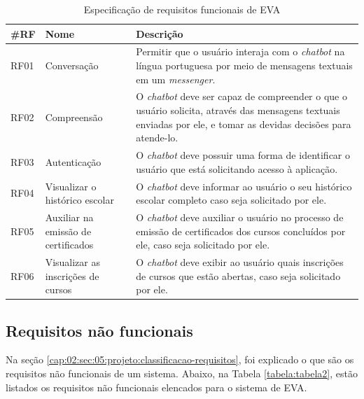 \begin{table}[htb]
\caption{Especificação de requisitos funcionais de EVA}
\label{tabela:tabela1}
\centering
\medskip
\begin{tabular}{|p{1.2cm}|p{3.5cm}|p{7.5cm}|}
  \hline
   \textbf{\#RF} & \textbf{Nome}  & \textbf{Descrição}  \\
    \hline
    RF01 & Conversação & Permitir que o usuário interaja com o \textit{chatbot} na língua portuguesa por meio de mensagens textuais em um \textit{messenger}. \\
    \hline
    RF02 & Compreensão & O \textit{chatbot} deve ser capaz de compreender o que o usuário solicita, através das mensagens textuais enviadas por ele, e tomar as devidas decisões para atende-lo. \\
    \hline
    RF03 & Autenticação & O \textit{chatbot} deve possuir uma forma de identificar o usuário que está solicitando acesso à aplicação. \\
   \hline
     RF04 & Visualizar o histórico escolar & O \textit{chatbot} deve informar ao usuário o seu histórico escolar completo caso seja solicitado por ele. \\
   \hline
    RF05 & Auxiliar na emissão de certificados & O \textit{chatbot} deve auxiliar o usuário no processo de emissão de certificados dos cursos concluídos por ele, caso seja solicitado por ele. \\
   \hline
    RF06 & Visualizar as inscrições de cursos & O \textit{chatbot} deve exibir ao usuário quais inscrições de cursos que estão abertas, caso seja solicitado por ele. \\
   \hline
\end{tabular}
\end{table}

\subsection{Requisitos não funcionais}

Na seção \ref{cap:02:sec:05:projeto:classificacao-requisitos}, foi explicado o que são os requisitos não funcionais de um sistema. Abaixo, na Tabela \ref{tabela:tabela2}, estão listados os requisitos não funcionais elencados para o sistema de EVA.

